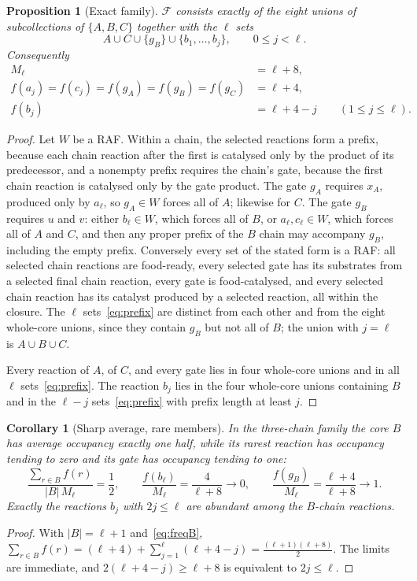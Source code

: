 \documentclass[11pt,a4paper]{article}
\theoremstyle{plain}
\newtheorem{proposition}[theorem]{Proposition}
\newtheorem{corollary}[theorem]{Corollary}
\theoremstyle{definition}
\theoremstyle{remark}
\newcommand{\FF}{\mathcal F}
\begin{document}
\begin{proposition}[Exact family]\label{prop:family}
$\FF$ consists exactly of the eight unions of subcollections of $\{A,B,C\}$ together with the $\ell$ sets
\begin{equation}\label{eq:prefix}
 A\cup C\cup\{g_B\}\cup\{b_1,\dots,b_j\},\qquad 0\le j<\ell .
\end{equation}
Consequently
\begin{align}
 M_\ell&=\ell+8,\label{eq:Mell}\\
 f(a_j)=f(c_j)=f(g_A)=f(g_B)=f(g_C)&=\ell+4,\label{eq:freqAC}\\
 f(b_j)&=\ell+4-j\qquad(1\le j\le\ell).\label{eq:freqB}
\end{align}
\end{proposition}
\begin{proof}
Let $W$ be a RAF. Within a chain, the selected reactions form a prefix, because each chain reaction after the first is catalysed only by the product of its predecessor, and a nonempty prefix requires the chain's gate, because the first chain reaction is catalysed only by the gate product. The gate $g_A$ requires $x_A$, produced only by $a_\ell$, so $g_A\in W$ forces all of $A$; likewise for $C$. The gate $g_B$ requires $u$ and $v$: either $b_\ell\in W$, which forces all of $B$, or $a_\ell,c_\ell\in W$, which forces all of $A$ and $C$, and then any proper prefix of the $B$ chain may accompany $g_B$, including the empty prefix. Conversely every set of the stated form is a RAF: all selected chain reactions are food-ready, every selected gate has its substrates from a selected final chain reaction, every gate is food-catalysed, and every selected chain reaction has its catalyst produced by a selected reaction, all within the closure. The $\ell$ sets~\eqref{eq:prefix} are distinct from each other and from the eight whole-core unions, since they contain $g_B$ but not all of $B$; the union with $j=\ell$ is $A\cup B\cup C$.

Every reaction of $A$, of $C$, and every gate lies in four whole-core unions and in all $\ell$ sets~\eqref{eq:prefix}. The reaction $b_j$ lies in the four whole-core unions containing $B$ and in the $\ell-j$ sets~\eqref{eq:prefix} with prefix length at least $j$.
\end{proof}

\begin{corollary}[Sharp average, rare members]\label{cor:sharp}
In the three-chain family the core $B$ has average occupancy exactly one half, while its rarest reaction has occupancy tending to zero and its gate has occupancy tending to one:
\[
 \frac{\sum_{r\in B}f(r)}{|B|\,M_\ell}=\frac12,\qquad
 \frac{f(b_\ell)}{M_\ell}=\frac4{\ell+8}\longrightarrow0,\qquad
 \frac{f(g_B)}{M_\ell}=\frac{\ell+4}{\ell+8}\longrightarrow1 .
\]
Exactly the reactions $b_j$ with $2j\le\ell$ are abundant among the $B$-chain reactions.
\end{corollary}
\begin{proof}
With $|B|=\ell+1$ and~\eqref{eq:freqB}, $\sum_{r\in B}f(r)=(\ell+4)+\sum_{j=1}^{\ell}(\ell+4-j)=\frac{(\ell+1)(\ell+8)}2$. The limits are immediate, and $2(\ell+4-j)\ge\ell+8$ is equivalent to $2j\le\ell$.
\end{proof}
\end{document}
